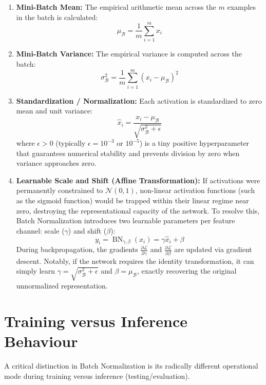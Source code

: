 \documentclass[12pt,a4paper]{article}
\begin{document}
\begin{enumerate}[leftmargin=*]
    \item \textbf{Mini-Batch Mean:} The empirical arithmetic mean across the $m$ examples in the batch is calculated:
    \begin{equation}
    \mu_{\mathcal{B}} = \frac{1}{m} \sum_{i=1}^{m} x_i
    \end{equation}
    \item \textbf{Mini-Batch Variance:} The empirical variance is computed across the batch:
    \begin{equation}
    \sigma_{\mathcal{B}}^2 = \frac{1}{m} \sum_{i=1}^{m} (x_i - \mu_{\mathcal{B}})^2
    \end{equation}
    \item \textbf{Standardization / Normalization:} Each activation is standardized to zero mean and unit variance:
    \begin{equation}
    \hat{x}_i = \frac{x_i - \mu_{\mathcal{B}}}{\sqrt{\sigma_{\mathcal{B}}^2 + \epsilon}}
    \end{equation}
    where $\epsilon > 0$ (typically $\epsilon = 10^{-3}$ or $10^{-5}$) is a tiny positive hyperparameter that guarantees numerical stability and prevents division by zero when variance approaches zero.
    \item \textbf{Learnable Scale and Shift (Affine Transformation):} If activations were permanently constrained to $\mathcal{N}(0, 1)$, non-linear activation functions (such as the sigmoid function) would be trapped within their linear regime near zero, destroying the representational capacity of the network. To resolve this, Batch Normalization introduces two learnable parameters per feature channel: scale ($\gamma$) and shift ($\beta$):
    \begin{equation}
    y_i = \operatorname{BN}_{\gamma, \beta}(x_i) = \gamma \hat{x}_i + \beta
    \end{equation}
    During backpropagation, the gradients $\frac{\partial \mathcal{L}}{\partial \gamma}$ and $\frac{\partial \mathcal{L}}{\partial \beta}$ are updated via gradient descent. Notably, if the network requires the identity transformation, it can simply learn $\gamma = \sqrt{\sigma_{\mathcal{B}}^2 + \epsilon}$ and $\beta = \mu_{\mathcal{B}}$, exactly recovering the original unnormalized representation.
\end{enumerate}

\section{Training versus Inference Behaviour}
A critical distinction in Batch Normalization is its radically different operational mode during training versus inference (testing/evaluation).
\end{document}
